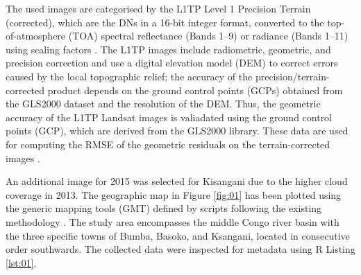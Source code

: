 \documentclass[applsci,article,accept,pdftex,moreauthors]{Definitions/mdpi}
\begin{document}
The used images are categorised by the L1TP Level 1 Precision Terrain (corrected), which are the DNs in a 16-bit integer format, converted to the top-of-atmosphere (TOA) spectral reflectance (Bands 1--9) or radiance (Bands 1--11) using scaling factors \cite{Engebretson}. The L1TP images include radiometric, geometric, and precision correction and use a digital elevation model (DEM) to correct errors caused by the local topographic relief; the accuracy of the precision/terrain-corrected product depends on the ground control points (GCPs) obtained from the GLS2000 dataset and the resolution of the DEM. Thus, the geometric accuracy of the L1TP Landsat images is valiadated using the ground control points (GCP), which are derived from the GLS2000 library. These data are used for computing the RMSE of the geometric residuals on the terrain-corrected images \cite{Engebretson}. 

An additional image for 2015 was selected for Kisangani due to the higher cloud coverage in 2013. The geographic map in Figure \ref{fig:01} has been plotted using the generic mapping tools (GMT) defined by scripts following the existing methodology \cite{Lemenkova202212,Lemenkova202217,Lemenkova2022b}. The study area encompasses the middle Congo river basin with the three specific towns of Bumba, Basoko, and Ksangani, located in consecutive order southwards. The collected data were inspected for metadata using R Listing \ref{lst:01}. 
\end{document}
